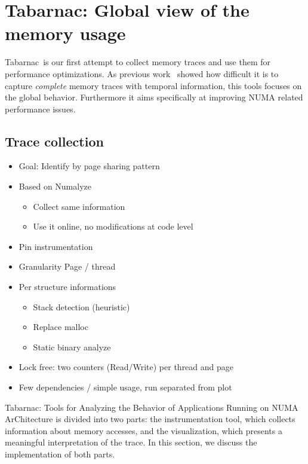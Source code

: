 \section{Tabarnac: Global view of the memory usage}

\acrfull{Tabarnac} is our first attempt to collect memory traces and use them for performance optimizations.
As previous work~\cite{Beniamine13Cartographier} showed how difficult it is to capture \emph{complete} memory traces with temporal information, this tools focuses on the global behavior.
Furthermore it aims specifically at improving \gls{NUMA} related performance issues.

\subsection{Trace collection}

\begin{itemize}
    \item Goal: Identify by page sharing pattern
    \item Based on Numalyze~\cite{Diener15Characterizing}
        \begin{itemize}
            \item Collect same information
            \item Use it online, no modifications at code level
        \end{itemize}
    \item Pin instrumentation
    \item Granularity Page / thread
    \item Per structure informations
        \begin{itemize}
            \item Stack detection (heuristic)
            \item Replace malloc
            \item Static binary analyze
        \end{itemize}
    \item Lock free: two counters (Read/Write) per thread and page
    \item Few dependencies / simple usage, run separated from plot
\end{itemize}

\gls{Tabarnac}: Tools for Analyzing the Behavior of Applications Running on NUMA
ArChitecture is divided into two parts: the instrumentation tool, which collects information about
memory accesses, and the visualization, which presents a meaningful
interpretation of the trace.
In this section, we discuss the implementation of both parts.

